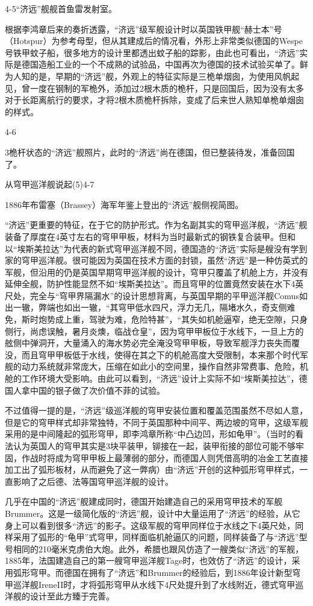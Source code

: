 \documentclass[12pt,UTF8]{ctexbook}
\begin{document}
4-5“济远”舰舰首鱼雷发射室。

根据李鸿章后来的奏折透露，“济远”级军舰设计时以英国铁甲舰“赫士本”号（Hotspur）为参考母型，但从其建成后的情况看，外形上非常类似德国的Wespe号铁甲蚊子船，很多地方的设计里都透出蚊子船的踪影，由此也可看出，“济远”实际是德国造船工业的一个不成熟的试验品，中国再次为德国的技术试验买单了。鲜为人知的是，早期的“济远”舰，外观上的特征实际是三桅单烟囱，为使用风帆起见，曾一度在钢制的军桅外，添加过2根木质的桅杆，只是回国后，因为没有太多对于长距离航行的要求，才将2根木质桅杆拆除，变成了后来世人熟知单桅单烟囱的样式。

4-6

3桅杆状态的“济远”舰照片，此时的“济远”尚在德国，但已整装待发，准备回国了。

从穹甲巡洋舰说起(5)4-7

1886年布雷塞（Brassey）海军年鉴上登出的“济远”舰侧视简图。

“济远”更重要的特征，在于它的防护形式。作为名副其实的穹甲巡洋舰，“济远”舰装备了厚度在4英寸左右的穹甲甲板，材料为当时最新式的钢铁复合装甲。但和以“埃斯美拉达”为代表的新式穹甲巡洋舰不同，德国造的“济远”实际是艘没有学到家的穹甲巡洋舰。很可能因为英国在技术方面的封锁，虽然“济远”是一种仿英式的军舰，但沿用的仍是英国早期穹甲巡洋舰的设计，穹甲只覆盖了机舱上方，并没有延伸全舰，防护性能显然不如“埃斯美拉达”。而且穹甲的位置竟然安装在水下4英尺处，完全与“穹甲界隔漏水”的设计思想背离，与英国早期的平甲巡洋舰Comus如出一辙，弊端也如出一辙，“其穹甲低水四尺，浮力无几，隔堵水久，奇支侧难免，斯时炮势成上重，驾驶为难，危险特甚”，“其失如机舱逼窄，绝无空隙，只身侧行，尚虑误触，暑月炎燠，临战仓皇”，因为穹甲甲板位于水线下，一旦上方的舷侧中弹洞开，大量涌入的海水势必完全淹没穹甲甲板，导致军舰浮力丧失而覆没，而且穹甲甲板低于水线，使得在其之下的机舱高度大受限制，本来那个时代军舰的动力系统就非常庞大，压缩在如此小的空间里，操作自然非常费事、危险，机舱的工作环境大受影响。由此可以看到，“济远”设计上实际不如“埃斯美拉达”，德国人拿中国的银子做了次价值不菲的试验。

不过值得一提的是，“济远”级巡洋舰的穹甲安装位置和覆盖范围虽然不尽如人意，但是它的穹甲样式却非常独特，不同于英国那种中间平、两边坡的穹甲，这级军舰采用的是中间隆起的弧形穹甲，即李鸿章所称“中凸边凹，形如龟甲”。（当时的看法认为英国人的穹甲其实是3块平装甲，铆接在一起，装甲衔接的部位可能不够牢固，作战时将成为穹甲甲板上最薄弱的部分，而德国人则凭借高明的冶金工艺直接加工出了弧形板材，从而避免了这一弊病）由“济远”开创的这种弧形穹甲样式，一直影响了之后德、法等国穹甲巡洋舰的设计。

几乎在中国的“济远”舰建成同时，德国开始建造自己的采用穹甲技术的军舰Brummer。这是一级简化版的“济远”舰，设计中大量运用了“济远”的经验，从它身上可以看到很多“济远”的影子。这级军舰的穹甲同样位于水线之下4英尺处，同样采用了弧形的“龟甲”式穹甲，同样面临机舱逼仄的问题，同样装备了与“济远”型号相同的210毫米克虏伯大炮。此外，希腊也跟风仿造了一艘类似“济远”的军舰，1885年，法国建造自己的第一艘穹甲巡洋舰Tage时，也效仿了“济远”的设计，采用弧形穹甲。而德国在拥有了“济远”和Brummer的经验后，到1886年设计新型穹甲巡洋舰IreneII时，才将弧形穹甲从水线下4尺处提升到了水线附近，德式穹甲巡洋舰的设计至此方臻于完善。
\end{document}
